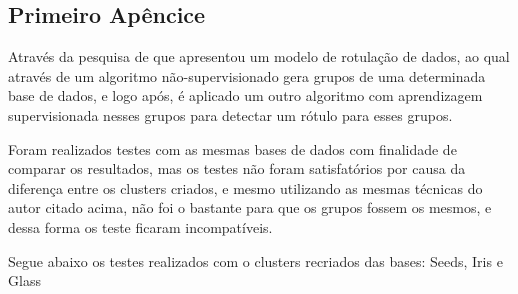 
\begin{apendicesenv}

\partapendices

\chapter{Primeiro Apêncice}
\label{apendice:1}

Através da pesquisa de  que apresentou um modelo de rotulação de dados, ao qual através de um algoritmo não-supervisionado gera grupos de uma determinada base de dados, e logo após, é aplicado um outro algoritmo com aprendizagem supervisionada nesses grupos para detectar um rótulo para esses grupos. 

Foram realizados testes com as mesmas bases de dados com finalidade de comparar os resultados, mas os testes não foram satisfatórios por causa  da diferença entre os clusters criados, e mesmo utilizando as mesmas técnicas do autor citado acima, não foi o bastante para que os grupos fossem os mesmos, e dessa forma os teste ficaram incompatíveis.

Segue abaixo os testes realizados com o clusters recriados das bases: Seeds, Iris e Glass


\end{apendicesenv}
